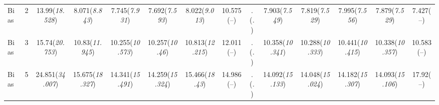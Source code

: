 \documentclass{article}
\begin{document}
\begin{table}[tbp]
{\begin{tabularx}{\textwidth}{lCCCCCCCCCCCCC}
Bias&2&13.99\newline (\emph{18.528})&8.071\newline (\emph{8.843})&7.745\newline (\emph{7.931})&7.692\newline (\emph{7.593})&8.022\newline (\emph{9.013})&10.575\newline (--)&.\newline (\emph{.})&7.903\newline (\emph{7.549})&7.819\newline (\emph{7.529})&7.995\newline (\emph{7.556})&7.879\newline (\emph{7.529})&7.427\newline (--) \tabularnewline
Bias&3&15.74\newline (\emph{20.753})&10.83\newline (\emph{11.945})&10.255\newline (\emph{10.573})&10.257\newline (\emph{10.46})&10.813\newline (\emph{12.215})&12.011\newline (--)&.\newline (\emph{.})&10.358\newline (\emph{10.341})&10.288\newline (\emph{10.333})&10.441\newline (\emph{10.415})&10.338\newline (\emph{10.357})&10.583\newline (--) \tabularnewline
Bias&5&24.851\newline (\emph{34.007})&15.675\newline (\emph{18.327})&14.341\newline (\emph{15.491})&14.259\newline (\emph{15.324})&15.466\newline (\emph{18.43})&14.986\newline (--)&.\newline (\emph{.})&14.092\newline (\emph{15.133})&14.048\newline (\emph{15.024})&14.182\newline (\emph{15.307})&14.093\newline (\emph{15.106})&17.92\newline (--) \tabularnewline

\end{tabularx}}
\end{table}
\end{document}
